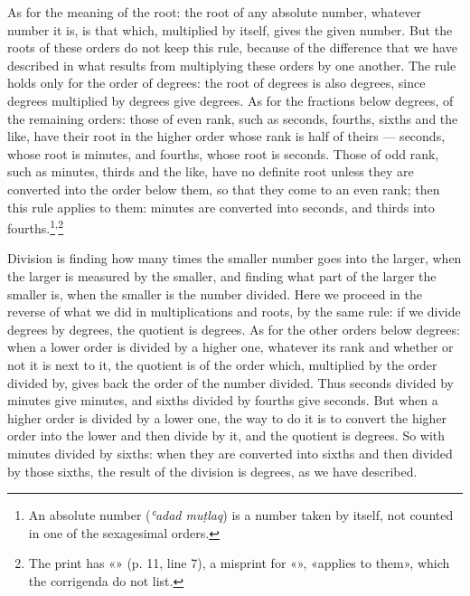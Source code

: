 \documentclass[11pt]{article}
\newcommand{\ArPage}[1]{\marginpar{\footnotesize\color{gray}Ar.\,p.\,#1}}
\begin{document}
\par \ArPage{11}As for the meaning of the root: the root of any absolute number, whatever number it is, is that which, multiplied by itself, gives the given number. But the roots of these orders do not keep this rule, because of the difference that we have described in what results from multiplying these orders by one another. The rule holds only for the order of degrees: the root of degrees is also degrees, since degrees multiplied by degrees give degrees. As for the fractions below degrees, of the remaining orders: those of even rank, such as seconds, fourths, sixths and the like, have their root in the higher order whose rank is half of theirs — seconds, whose root is minutes, and fourths, whose root is seconds. Those of odd rank, such as minutes, thirds and the like, have no definite root unless they are converted into the order below them, so that they come to an even rank; then this rule applies to them: minutes are converted into seconds, and thirds into fourths.\footnote{An absolute number (\emph{ʿadad muṭlaq}) is a number taken by itself, not counted in one of the sexagesimal orders.}\textsuperscript{,}\footnote{The print has «» (p. 11, line 7), a misprint for «», «applies to them», which the corrigenda do not list.}\par
\par Division is finding how many times the smaller number goes into the larger, when the larger is measured by the smaller, and finding what part of the larger the smaller is, when the smaller is the number divided. Here we proceed in the reverse of what we did in multiplications and roots, by the same rule: if we divide degrees by degrees, the quotient is degrees. As for the other orders below degrees: when a lower order is divided by a higher one, whatever its rank and whether or not it is next to it, the quotient is of the order which, multiplied by the order divided by, gives back the order of the number divided. Thus seconds divided by minutes give minutes, and sixths divided by fourths give seconds. But when a higher order is divided by a lower one, the way to do it is to convert the higher order into the lower and then divide by it, and the quotient is degrees. So with minutes divided by sixths: when they are converted into sixths and then divided by those sixths, the result of the division is degrees, as we have described.\par
\end{document}
